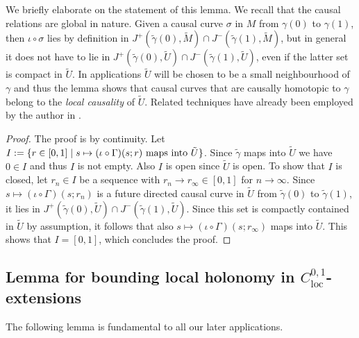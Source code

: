 \documentclass[reqno]{article}
\newcommand{\loc}{\mathrm{loc}}
\begin{document}
We briefly elaborate on the statement of this lemma. We recall that the causal relations are global in nature. Given a causal curve $\sigma$ in $M$ from $\gamma(0)$ to $\gamma(1)$, then $\iota \circ \sigma$ lies by definition in  $J^+(\tilde{\gamma}(0),\tilde{M}) \cap J^-(\tilde{\gamma}(1),\tilde{M})$, but in general it does not have to lie in $J^+(\tilde{\gamma}(0),\tilde{U}) \cap J^-(\tilde{\gamma}(1),\tilde{U})$, even if the latter set is compact in $\tilde{U}$.  In applications $\tilde{U}$ will be chosen to be a small neighbourhood of $\gamma$ and thus the lemma shows that causal curves that are causally homotopic to $\gamma$ belong to the \emph{local causality} of $\tilde{U}$. Related techniques have already been employed by the author in \cite{Sbie15}.

\begin{proof}
The proof is by continuity. Let $I:= \{ r \in [0,1] \; | \; s \mapsto (\iota \circ \Gamma) (s ; r) \textnormal{ maps into } \tilde{U}\}$. Since $\tilde{\gamma}$ maps into $\tilde{U}$ we have $0 \in I$ and thus $I $ is not empty. Also $I$ is open since $\tilde{U}$ is open. To show that $I$ is closed, let $r_n \in I$ be a sequence with $r_n \to r_\infty \in [0,1]$ for $n \to \infty$. Since $s \mapsto (\iota \circ \Gamma)(s ; r_n)$ is a future directed causal curve in $\tilde{U}$ from $\tilde{\gamma}(0)$ to $\tilde{\gamma}(1)$, it lies in $J^+(\tilde{\gamma}(0), \tilde{U}) \cap J^-(\tilde{\gamma}(1), \tilde{U})$. Since this set is compactly contained in $\tilde{U}$ by assumption, it follows that also $s \mapsto (\iota \circ \Gamma)(s; r_\infty)$ maps into $\tilde{U}$. This shows that $I = [0,1]$, which concludes the proof.
\end{proof}




\subsection{Lemma for bounding local holonomy in $C^{0,1}_{\loc}$-extensions}
\label{SecLemBound}
The following lemma is  fundamental to all our later applications.
\end{document}
